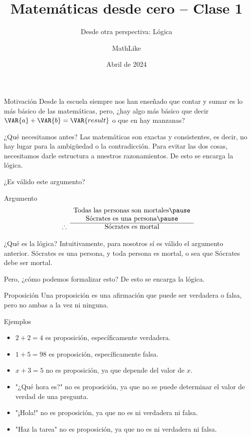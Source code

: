 \documentclass[dvisvgm,hypertex,aspectratio=169]{beamer}
\title{Matemáticas desde cero -- Clase 1}
\subtitle{Desde otra perspectiva: Lógica}
\author{MathLike}
\date{Abril de 2024}
\institute{Administrador de The Math Guys}
\begin{document}
\begin{frame}
  \titlepage
\end{frame}
\begin{frame}{Motivación}
  Desde la escuela siempre nos han enseñado que contar y sumar es lo más básico
  de las matemáticas, pero, ¿hay algo más básico que decir $\VAR{a}+\VAR{b}=\VAR{result}$
  o que en  hay  manzanas?
\end{frame}
\begin{frame}{¿Qué necesitamos antes?}
  Las matemáticas son exactas y consistentes, es decir, no hay lugar para la
  ambigüedad o la contradicción. \pause{}Para evitar las dos cosas, necesitamos darle
  estructura a nuestros razonamientos. De esto se encarga la \alert{lógica}.
\end{frame}
\begin{frame}{¿Es válido este argumento?}
  \begin{block}{Argumento}
    \pause
    \[
    \begin{array}{ c c }
      &\text{Todas las personas son mortales} \pause\\
      &\text{Sócrates es una persona} \pause\\
      \cline{2-2}
      \therefore &\text{Sócrates es mortal}
    \end{array}
    \]
  \end{block}
\end{frame}
\begin{frame}{¿Qué es la lógica?}
  Intuitivamente, para nosotros sí es válido el argumento anterior. Sócrates es una persona, y toda persona es mortal, o sea que Sócrates debe ser mortal.

  \pause Pero, ¿cómo podemos formalizar esto? De esto se encarga la lógica.
\end{frame}
\begin{frame}{Proposición}
  Una proposición es una afirmación que puede ser verdadera o falsa, pero no ambas a la vez ni ninguna.

  \begin{block}{Ejemplos}
    \begin{itemize}
      \item $2+2=4$ es proposición, específicamente verdadera.
      \item $1+5=98$ es proposición, específicamente falsa.
      \item $x+3=5$ no es proposición, ya que depende del valor de $x$.
      \item "¿Qué hora es?" no es proposición, ya que no se puede determinar el valor de verdad de una pregunta.
      \item "¡Hola!" no es proposición, ya que no es ni verdadera ni falsa.
      \item "Haz la tarea" no es proposición, ya que no es ni verdadera ni falsa.
    \end{itemize}
  \end{block}
\end{frame}
\end{document}
